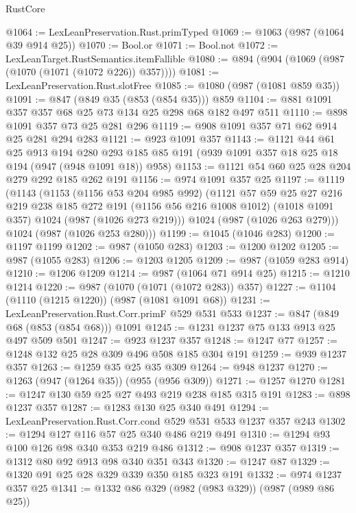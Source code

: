 \begin{lexlean}{RustCore}
\begin{coremodule}
@1064 := LexLeanPreservation.Rust.primTyped
@1069 := @1063 (@987 (@1064 @39 @914 @25))
@1070 := Bool.or
@1071 := Bool.not
@1072 := LexLeanTarget.RustSemantics.itemFallible
@1080 := @894 (@904 (@1069 (@987 (@1070 (@1071 (@1072 @226)) @357))))
@1081 := LexLeanPreservation.Rust.slotFree
@1085 := @1080 (@987 (@1081 @859 @35))
@1091 := @847 (@849 @35 (@853 (@854 @35))) @859
@1104 := @881 @1091 @357 @357 @68 @25 @73 @134 @25 @298 @68 @182 @497 @511
@1110 := @898 @1091 @357 @73 @25 @281 @296
@1119 := @908 @1091 @357 @71 @62 @914 @25 @281 @294 @283
@1121 := @923 @1091 @357
@1143 := @1121
    @44
    @61
    @25
    @913
    @194
    @280
    @293
    @185
    @85
    @191
    (@939 @1091 @357 @18 @25 @18 @194 (@947 (@948 @1091 @18)) @958)
@1153 := @1121 @54 @60 @25 @28 @204 @279 @292 @185 @262 @191
@1156 := @974 @1091 @357 @25
@1197 := @1119
    (@1143
      (@1153
        (@1156 @53 @204 @985 @992)
        (@1121
          @57
          @59
          @25
          @27
          @216
          @219
          @238
          @185
          @272
          @191
          (@1156 @56 @216 @1008 @1012)
          (@1018 @1091 @357)
          @1024
          (@987 (@1026 @273 @219)))
        @1024
        (@987 (@1026 @263 @279)))
      @1024
      (@987 (@1026 @253 @280)))
@1199 := @1045 (@1046 @283)
@1200 := @1197 @1199
@1202 := @987 (@1050 @283)
@1203 := @1200 @1202
@1205 := @987 (@1055 @283)
@1206 := @1203 @1205
@1209 := @987 (@1059 @283 @914)
@1210 := @1206 @1209
@1214 := @987 (@1064 @71 @914 @25)
@1215 := @1210 @1214
@1220 := @987 (@1070 (@1071 (@1072 @283)) @357)
@1227 := @1104 (@1110 (@1215 @1220)) (@987 (@1081 @1091 @68))
@1231 := LexLeanPreservation.Rust.Corr.primF @529 @531 @533
@1237 := @847 (@849 @68 (@853 (@854 @68))) @1091
@1245 := @1231 @1237 @75 @133 @913 @25 @497 @509 @501
@1247 := @923 @1237 @357
@1248 := @1247 @77
@1257 := @1248 @132 @25 @28 @309 @496 @508 @185 @304 @191
@1259 := @939 @1237 @357
@1263 := @1259 @35 @25 @35 @309
@1264 := @948 @1237
@1270 := @1263 (@947 (@1264 @35)) (@955 (@956 @309))
@1271 := @1257 @1270
@1281 := @1247 @130 @59 @25 @27 @493 @219 @238 @185 @315 @191
@1283 := @898 @1237 @357
@1287 := @1283 @130 @25 @340 @491
@1294 := LexLeanPreservation.Rust.Corr.cond @529 @531 @533 @1237 @357 @243
@1302 := @1294 @127 @116 @57 @25 @340 @486 @219 @491
@1310 := @1294 @93 @100 @126 @98 @340 @353 @219 @486
@1312 := @908 @1237 @357
@1319 := @1312 @80 @92 @913 @98 @340 @351 @343
@1320 := @1247 @87
@1329 := @1320 @91 @25 @28 @329 @339 @350 @185 @323 @191
@1332 := @974 @1237 @357 @25
@1341 := @1332 @86 @329 (@982 (@983 @329)) (@987 (@989 @86 @25))

\end{coremodule}
\end{lexlean}
